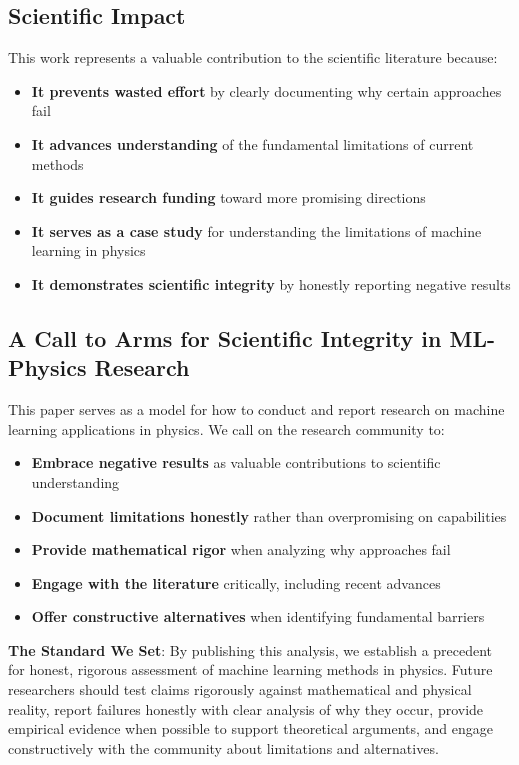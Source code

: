 \documentclass[11pt,a4paper]{article}
\begin{document}
\subsection{Scientific Impact}

This work represents a valuable contribution to the scientific literature because:

\begin{itemize}
    \item \textbf{It prevents wasted effort} by clearly documenting why certain approaches fail
    \item \textbf{It advances understanding} of the fundamental limitations of current methods
    \item \textbf{It guides research funding} toward more promising directions
    \item \textbf{It serves as a case study} for understanding the limitations of machine learning in physics
    \item \textbf{It demonstrates scientific integrity} by honestly reporting negative results
\end{itemize}

\subsection{A Call to Arms for Scientific Integrity in ML-Physics Research}

This paper serves as a model for how to conduct and report research on machine learning applications in physics. We call on the research community to:

\begin{itemize}
    \item \textbf{Embrace negative results} as valuable contributions to scientific understanding
    \item \textbf{Document limitations honestly} rather than overpromising on capabilities
    \item \textbf{Provide mathematical rigor} when analyzing why approaches fail
    \item \textbf{Engage with the literature} critically, including recent advances
    \item \textbf{Offer constructive alternatives} when identifying fundamental barriers
\end{itemize}

\textbf{The Standard We Set}: By publishing this analysis, we establish a precedent for honest, rigorous assessment of machine learning methods in physics. Future researchers should test claims rigorously against mathematical and physical reality, report failures honestly with clear analysis of why they occur, provide empirical evidence when possible to support theoretical arguments, and engage constructively with the community about limitations and alternatives.
\end{document}
